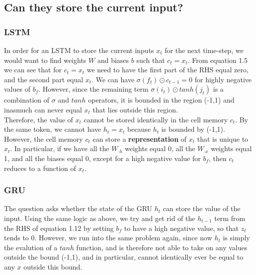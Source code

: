 \documentclass[paper=a4, fontsize=11pt]{scrartcl} %
\numberwithin{equation}{section} %
\numberwithin{figure}{section} %
\numberwithin{table}{section} %
\begin{document}
\subsection{Can they store the current input?}


\subsubsection{LSTM}

In order for an LSTM to store the current inputs $x_t$ for the next time-step, we would want to find weights $W$ and biases $b$ such that $c_t = x_t$. From equation 1.5 we can see that for $c_t = x_t$ we need to have the first part of the RHS equal zero, and the second part equal $x_t$. We can have $\sigma (f_t) \odot c_{t-1} = 0$ for highly negative values of $b_f$. However, since the remaining term $\sigma (i_t) \odot	 tanh(j_t)$ is a combination of $\sigma$ and $tanh$ operators, it is bounded in the region (-1,1) and inasmuch can never equal $x_t$ that lies outside this region.\\


Therefore, the value of $x_t$ cannot be stored identically in the cell memory $c_t$. By the same token, we cannot have $h_t = x_t$ because $h_t$ is bounded by (-1,1).\\


However, the cell memory $c_t$ can store a \textbf{representation} of $x_t$ that is unique to $x_t$. In particular, if we have all the $W_{\cdot h}$ weights equal 0, all the $W_{\cdot x}$ weights equal 1, and all the biases equal 0, except for a high negative value for $b_f$, then $c_t$ reduces to a function of $x_t$.



\subsubsection{GRU}


The question asks whether the state of the GRU $h_t$ can store the value of the input. Using the same logic as above, we try and get rid of the $h_{t-1}$ term from the RHS of equation 1.12 by setting $b_f$ to have a high negative value, so that $z_t$ tends to 0. However, we run into the same problem again, since now $h_t$ is simply the evalution of a $tanh$ function, and is therefore not able to take on any values outside the bound (-1,1), and in particular, cannot identically ever be equal to any $x$ outside this bound.\\
\end{document}
